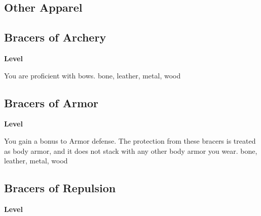 \subsection{Other Apparel}
\begin{multicols}{2}
\lowercase{\hypertarget{item:Bracers of Archery}{}}\label{item:Bracers of Archery}
\hypertarget{item:Bracers of Archery}{\subsection{Bracers of Archery}}
\columnbreak%
\begin{flushright}
\large\textbf{ Level}
\end{flushright}
\end{multicols}
\vspace{-1.5em}  %
You are proficient with bows.
 
 bone, leather, metal, wood
\begin{multicols}{2}
\lowercase{\hypertarget{item:Bracers of Armor}{}}\label{item:Bracers of Armor}
\hypertarget{item:Bracers of Armor}{\subsection{Bracers of Armor}}
\columnbreak%
\begin{flushright}
\large\textbf{ Level}
\end{flushright}
\end{multicols}
\vspace{-1.5em}  %
You gain a  bonus to Armor defense.
The protection from these bracers is treated as body armor, and it does not stack with any other body armor you wear.
 
 bone, leather, metal, wood
\begin{multicols}{2}
\lowercase{\hypertarget{item:Bracers of Repulsion}{}}\label{item:Bracers of Repulsion}
\hypertarget{item:Bracers of Repulsion}{\subsection{Bracers of Repulsion}}
\columnbreak%
\begin{flushright}
\large\textbf{ Level}
\end{flushright}
\end{multicols}
\vspace{-1.5em}  %
